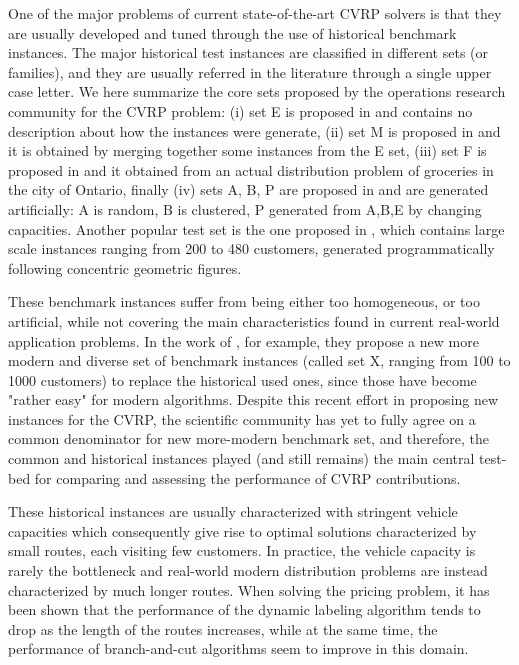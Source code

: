 One of the major problems of current state-of-the-art CVRP solvers
is that they are usually developed and tuned through the use of historical
benchmark instances.
The major historical test instances are classified in different sets (or families), and
they are usually referred in the literature through a single upper case letter.
We here summarize the core sets proposed by the operations research community for the CVRP problem:
(i) set E is proposed in \textcite{christofides1969} and contains no description about how the instances were generate,
(ii) set M is proposed in \textcite{christofides1979} and it is obtained by merging together some instances from the E set,
(iii) set F is proposed in \textcite{fisher1994} and it obtained from an actual distribution problem of groceries in the city of Ontario,
finally (iv) sets A, B, P are proposed in \textcite{augerat1995} and are generated artificially: A is random, B is clustered, P generated from A,B,E by changing capacities.
Another popular test set is the one proposed in \textcite{golden1998},
which contains large scale instances ranging from 200 to 480 customers,
generated programmatically following concentric geometric figures.

These benchmark instances suffer from being either too homogeneous, or too artificial,
while not covering the main characteristics found in current real-world application problems.
In the work of \textcite{uchoa2017}, for example, they propose
a new more modern and diverse set of benchmark instances (called set X, ranging from 100 to 1000 customers)
to replace the historical used ones, since those have become "rather easy" for modern algorithms.
Despite this recent effort in proposing new instances for the CVRP, the scientific community
has yet to fully agree on a common denominator for new more-modern benchmark set, and therefore,
the common and historical instances played (and still remains) the main central test-bed for comparing
and assessing the performance of CVRP contributions.

These historical instances are usually characterized with stringent vehicle capacities
which consequently give rise to optimal solutions characterized by small routes, each visiting few customers.
In practice, the vehicle capacity is rarely the bottleneck and
real-world modern distribution problems are instead characterized by much longer routes.
When solving the pricing problem, it  has been shown that the performance of the dynamic labeling algorithm
tends to drop as the length of the routes increases,
while at the same time,
the performance of branch-and-cut algorithms seem to improve in this domain.

